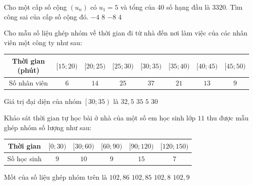 \begin{ex}%
	Cho một cấp số cộng $\left(u_n\right)$ có $u_1=5$ và tổng của 40 số hạng đầu là $3320$. Tìm công sai của cấp số cộng đó.
	\choice
	{$-4$}
	{$8$}
	{$-8$}
	{\True $4$}
\end{ex}

\begin{ex}%
	Cho mẫu số liệu ghép nhóm về thời gian đi từ nhà đến nơi làm việc của các nhân viên một công ty như sau:
	\begin{center}
		\begin{tabular}{|c|c|c|c|c|c|c|c|}
			\hline
			Thời gian (phút) & $[15;20)$ & $[20;25)$ & $[25;30)$ & $[30;35)$ & $[35;40)$ & $[40;45)$ & $[45;50)$ \\
			\hline
			Số nhân viên     & $6$       & $14$      & $25$      & $37$      & $21$      & $13$      & $9$       \\
			\hline
		\end{tabular}
	\end{center}
	Giá trị đại diện của nhóm $\left[30;35\right)$ là
	\choice
	{\True $ 32{,}5$}
	{$35$}
	{$5$}
	{$30$}
	\loigiai{
	Giá trị đại diện của nhóm $\left[30;35\right)$ là $\dfrac{30+35}{2}=32{,}5$.
	}
\end{ex}

\begin{ex}%
	Khảo sát thời gian tự học bài ở nhà của một số em học sinh lớp $11$ thu được mẫu ghép nhóm số lượng như sau:
	\begin{center}
		\begin{tabular}{|c|c|c|c|c|c|}
			\hline
			Thời gian   & {$[0; 30)$} & {$[30; 60)$} & {$[60; 90)$} & {$[90; 120)$} & {$[120; 150)$} \\
			\hline
			Số học sinh & $9$         & $10$         & $9$          & $15$          & $7$            \\
			\hline
		\end{tabular}
	\end{center}
	Mốt của số liệu ghép nhóm trên là
	\choice
	{\True $102{,}86$}
	{$102{,}85$}
	{$102{,}8$}
	{$102{,}9$}
\end{ex}

